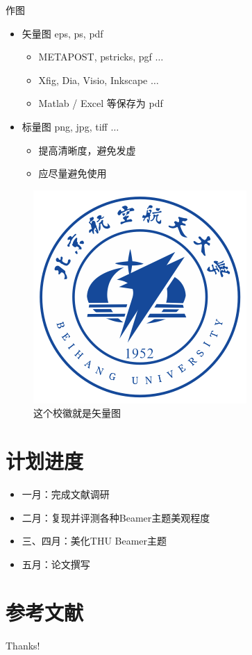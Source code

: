 \documentclass[aspectratio=169]{beamer}
\begin{document}
\begin{frame}{作图}
    \begin{itemize}
        \item 矢量图 eps, ps, pdf
              \begin{itemize}
                  \item METAPOST, pstricks, pgf $\ldots$
                  \item Xfig, Dia, Visio, Inkscape $\ldots$
                  \item Matlab / Excel 等保存为 pdf
              \end{itemize}
        \item 标量图 png, jpg, tiff $\ldots$
              \begin{itemize}
                  \item 提高清晰度，避免发虚
                  \item 应尽量避免使用
              \end{itemize}
    \end{itemize}
    \begin{figure}[htpb]
        \centering
        \includegraphics[width=0.2\linewidth]{figure/buaa_logo.png}
        \caption{这个校徽就是矢量图}
    \end{figure}
\end{frame}

\section{计划进度}
\begin{frame}
    \begin{itemize}
        \item 一月：完成文献调研
        \item 二月：复现并评测各种Beamer主题美观程度
        \item 三、四月：美化THU Beamer主题
        \item 五月：论文撰写
    \end{itemize}
\end{frame}

\section{参考文献}

\begin{frame}[allowframebreaks]
    
    
\end{frame}

\begin{frame}
    \begin{center}
        {\Huge\calligra Thanks!}
    \end{center}
\end{frame}
\end{document}
